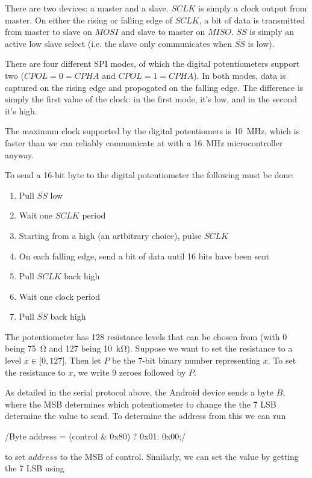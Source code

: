 There are two devices: a master and a slave. $SCLK$ is simply a clock output
from master. On either the rising or falling edge of $SCLK$, a bit of data is
transmitted from master to slave on $MOSI$ and slave to master on $MISO$.
$\overline{SS}$ is simply an active low slave select (i.e. the slave only
communicates when $\overline{SS}$ is low).

There are four different SPI modes, of which the digital potentiometers support
two ($CPOL=0=CPHA$ and $CPOL=1=CPHA$). In both modes, data is captured on the
rising edge and propogated on the falling edge. The difference is simply the
first value of the clock: in the first mode, it's low, and in the second it's
high.

The maximum clock supported by the digital potentiomers is \SI{10}{\MHz}, which
is faster than we can reliably communicate at with a \SI{16}{\MHz}
microcontroller anyway.

To send a 16-bit byte to the digital potentiometer the following must be done:
\begin{enumerate}
  \item Pull $\overline{SS}$ low
  \item Wait one $SCLK$ period
  \item Starting from a high (an artbitrary choice), pulse $SCLK$
  \item On each falling edge, send a bit of data until 16 bits have been sent
  \item Pull $SCLK$ back high
  \item Wait one clock period
  \item Pull $\overline{SS}$ back high
\end{enumerate}

The potentiometer has 128 resistance levels that can be chosen from (with 0
being \SI{75}{\ohm} and 127 being \SI{10}{\kilo\ohm}). Suppose we want to set
the resistance to a level $x \in \mathopen[0,127\mathclose]$. Then let $P$ be
the 7-bit binary number representing $x$. To set the resistance to $x$, we write
9 zeroes followed by $P$.

As detailed in the serial protocol above, the Android device sends a byte $B$,
where the MSB determines which potentiometer to change the the 7 LSB determine
the value to send. To determine the address from this we can run

/Byte address = (control & 0x80) ? 0x01: 0x00;/

to set $address$ to the MSB of control. Similarly, we can set the value by
getting the 7 LSB using

